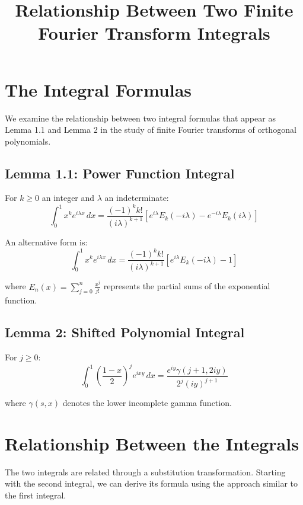 \documentclass{article}
\title{Relationship Between Two Finite Fourier Transform Integrals}
\author{}
\date{}
\begin{document}
\maketitle

\section{The Integral Formulas}

We examine the relationship between two integral formulas that appear as Lemma 1.1 and Lemma 2 in the study of finite Fourier transforms of orthogonal polynomials.

\subsection{Lemma 1.1: Power Function Integral}

For $k \geq 0$ an integer and $\lambda$ an indeterminate:
\begin{equation}
\int_0^1 x^k e^{i\lambda x} \, dx = \frac{(-1)^k k!}{(i\lambda)^{k+1}}\left[e^{i\lambda}E_k(-i\lambda) - e^{-i\lambda}E_k(i\lambda)\right]
\end{equation}

An alternative form is:
\begin{equation}
\int_0^1 x^k e^{i\lambda x} \, dx = \frac{(-1)^k k!}{(i\lambda)^{k+1}}\left[e^{i\lambda}E_k(-i\lambda) - 1\right]
\end{equation}

where $E_n(x) = \sum_{j=0}^{n} \frac{x^j}{j!}$ represents the partial sums of the exponential function.

\subsection{Lemma 2: Shifted Polynomial Integral}

For $j \geq 0$:
\begin{equation}
\int_0^1 \left(\frac{1-x}{2}\right)^j e^{ixy} \, dx = \frac{e^{iy} \gamma(j+1,2iy)}{2^j (iy)^{j+1}}
\end{equation}

where $\gamma(s,x)$ denotes the lower incomplete gamma function.

\section{Relationship Between the Integrals}

The two integrals are related through a substitution transformation. Starting with the second integral, we can derive its formula using the approach similar to the first integral.
\end{document}
